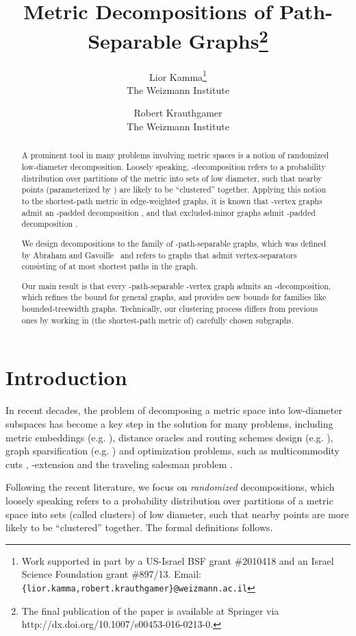 \documentclass[11pt,fleqn]{article}
\title{Metric Decompositions of Path-Separable Graphs\thanks{The final publication of the paper is available at Springer via http://dx.doi.org/10.1007/s00453-016-0213-0.}}
\author{Lior Kamma\thanks{Work supported in part by a US-Israel BSF grant \#2010418
and an Israel Science Foundation grant \#897/13.
Email: \texttt{\{lior.kamma,robert.krauthgamer\}@weizmann.ac.il}
}
\\ The Weizmann Institute
\and Robert Krauthgamer\footnotemark[\value{footnote}]
\\ The Weizmann Institute
}
\begin{document}
\maketitle

\begin{abstract}
A prominent tool in many problems involving metric spaces is 
a notion of randomized low-diameter decomposition.
Loosely speaking, -decomposition refers to a probability distribution 
over partitions of the metric into sets of low diameter, 
such that nearby points (parameterized by )
are likely to be ``clustered'' together.
Applying this notion to the shortest-path metric in edge-weighted graphs,
it is known that -vertex graphs admit 
an -padded decomposition \cite{Bartal96},
and that excluded-minor graphs admit -padded decomposition 
\cite{KPR93,FT03,AGGNT14}.

We design decompositions to the family of -path-separable graphs,
which was defined by Abraham and Gavoille~\cite{AG06}
and refers to graphs that admit vertex-separators consisting 
of at most  shortest paths in the graph.

Our main result is that every -path-separable -vertex graph 
admits an -decomposition,
which refines the  bound for general graphs, 
and provides new bounds for families like bounded-treewidth graphs.
Technically, our clustering process differs from previous ones 
by working in (the shortest-path metric of) carefully chosen subgraphs.
\end{abstract}


\section{Introduction} \label{sec:intro}
In recent decades, the problem of decomposing a metric space into low-diameter subspaces has become a key step in the solution for many problems, including metric embeddings (e.g. \cite{Assouad83,Bartal96,Rao99,GKL03,FRT04,KLMN05}), distance oracles and routing schemes design (e.g. \cite{AP90,DSB97,Talwar04,CGMZ05,MN07}), graph sparsification (e.g. \cite{EGKRTT2010,KKN14}) and optimization problems, such as multicommodity cuts \cite{KPR93,GVY96,LR99}, -extension \cite{CKR04} and the traveling salesman problem \cite{Talwar04}.

Following the recent literature, we focus on \emph{randomized} decompositions, which loosely speaking refers to a probability distribution over partitions 
of a metric space into sets (called clusters) of low diameter, 
such that nearby points are more likely to be ``clustered'' together.
The formal definitions follows.
\end{document}
